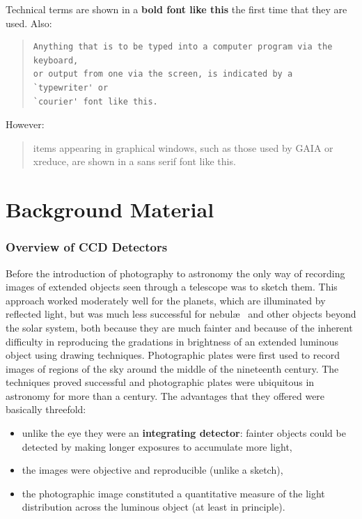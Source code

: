 \documentclass[twoside,11pt]{article}
\newcommand{\stardocinitials}  {SC}
\newcommand{\stardocnumber}    {5.3}
\newcommand{\stardocname}{\stardocinitials /\stardocnumber}
\newcommand{\xlabel}[1]{}
\begin{document}
Technical terms are shown in a {\bf bold font like this} the first
time that they are used.  Also:

\begin{quote}
\begin{verbatim}
Anything that is to be typed into a computer program via the keyboard,
or output from one via the screen, is indicated by a `typewriter' or
`courier' font like this.
\end{verbatim}
\end{quote}

However:

\begin{quote}
{\sf items appearing in graphical windows, such as those used by GAIA
or xreduce, are shown in a sans serif font like this.}
\end{quote}


\cleardoublepage
\markboth{\stardocname}{\stardocname}
\part{Background Material}
\markboth{\stardocname}{\stardocname}
\section{\xlabel{WHAT}\label{WHAT}Overview of CCD Detectors}

Before the introduction of photography to astronomy the only way of
recording images of extended objects seen through a telescope was to
sketch them.  This approach worked moderately well for the planets, which
are illuminated by reflected light, but was much less successful for 
nebul\ae~ and other objects beyond the solar system, both because they
are much fainter and because of the inherent difficulty in reproducing
the gradations in brightness of an extended luminous object using 
drawing techniques.  Photographic plates were first used to record images
of regions of the sky around the middle of the nineteenth century.  The
techniques proved successful and photographic plates were ubiquitous in
astronomy for more than a century.  The advantages that they offered
were basically threefold:

\begin{itemize}

  \item unlike the eye they were an {\bf integrating detector}: fainter
   objects could be detected by making longer exposures to accumulate
   more light,

  \item the images were objective and reproducible (unlike a sketch),

  \item the photographic image constituted a quantitative measure of the
   light distribution across the luminous object (at least in principle).

\end{itemize}
\end{document}
